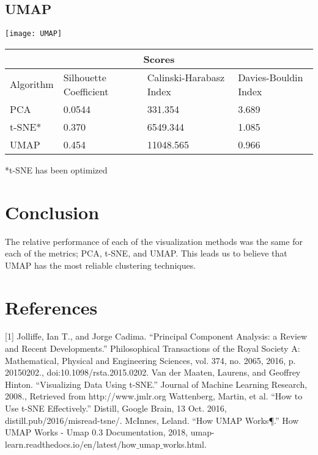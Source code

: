 \documentclass[11pt]{article}
\theoremstyle{definition}
\begin{document}
\subsection{UMAP}
\begin{center}
\texttt{[image: UMAP]}
\end{center}

\begin{center}
\begin{tabular}{ |p{2cm}||p{4cm}||p{4.2cm}||p{4.2cm}|}
 \hline
 \multicolumn{4}{|c|}{Scores} \\
 \hline
 Algorithm & Silhouette Coefficient & Calinski-Harabasz Index & Davies-Bouldin Index \\
 \hline
PCA & 0.0544 & 331.354 & 3.689\\
t-SNE* & 0.370 & 6549.344 & 1.085\\
UMAP & 0.454 & 11048.565 & 0.966\\
 \hline
\end{tabular}
\end{center}
*t-SNE has been optimized
\section{Conclusion}
The relative performance of each of the visualization methods was the same for each of the metrics; PCA, t-SNE, and UMAP. This leads us to believe that UMAP has the most reliable clustering techniques. 
\section{References}
[1] Jolliffe, Ian T., and Jorge Cadima. “Principal Component Analysis: a Review and Recent Developments.” Philosophical Transactions of the Royal Society A: Mathematical, Physical and Engineering Sciences, vol. 374, no. 2065, 2016, p. 20150202., doi:10.1098/rsta.2015.0202. \newline
[2] Van der Maaten, Laurens, and Geoffrey Hinton. “Visualizing Data Using t-SNE.” Journal of Machine Learning Research, 2008., Retrieved from http://www.jmlr.org \newline
[3] Wattenberg, Martin, et al. “How to Use t-SNE Effectively.” Distill, Google Brain, 13 Oct. 2016, distill.pub/2016/misread-tsne/. \newline
[4] McInnes, Leland. “How UMAP Works¶.” How UMAP Works - Umap 0.3 Documentation, 2018, umap-learn.readthedocs.io/en/latest/how$\_$umap$\_$works.html. \newline
\end{document}
